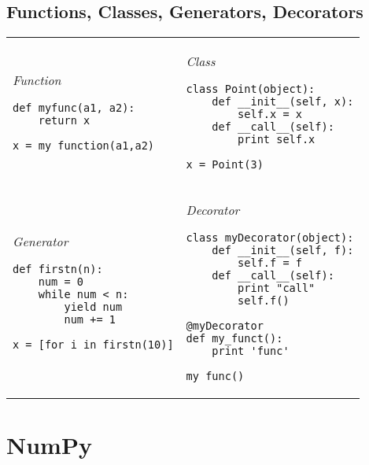 \documentclass[10pt, a4paper, twocolumn]{article}
\begin{document}
\subsection*{Functions, Classes, Generators, Decorators}
\begin{tabular}{ p{} p{} }
    \begin{minipage}[t]{\columnwidth}
    \textit{Function}
\begin{verbatim}
def myfunc(a1, a2):
    return x

x = my_function(a1,a2)
\end{verbatim}
\end{minipage}
&
\begin{minipage}[t]{\columnwidth}
    \textit{Class}
\begin{verbatim}
class Point(object):
    def __init__(self, x):
        self.x = x
    def __call__(self):
        print self.x

x = Point(3)
\end{verbatim}
\end{minipage}\\
\rule{0pt}{0.5cm}

\begin{minipage}[t]{\columnwidth}
    \textit{Generator}
\begin{verbatim}
def firstn(n):
    num = 0
    while num < n:
        yield num
        num += 1

x = [for i in firstn(10)]
\end{verbatim}
\end{minipage}
&
\begin{minipage}[t]{\columnwidth}
    \textit{Decorator}
\begin{verbatim}
class myDecorator(object):
    def __init__(self, f):
        self.f = f
    def __call__(self):
        print "call"
        self.f()

@myDecorator
def my_funct():
    print 'func'

my_func()
\end{verbatim}
\end{minipage}
\end{tabular}


\section*{NumPy}
\end{document}
